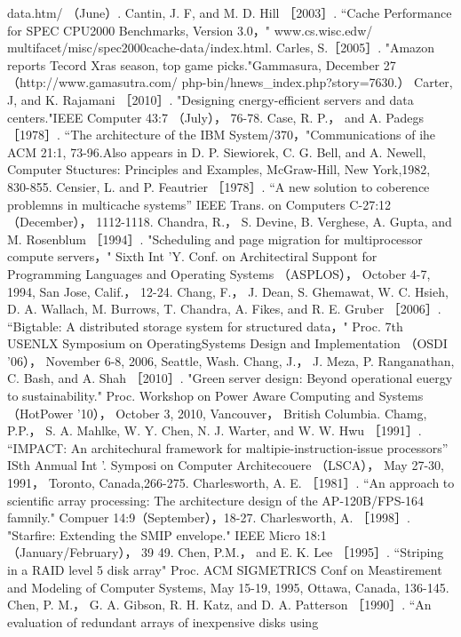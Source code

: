 data.htm/ （June）.
Cantin, J. F, and M. D. Hill ［2003］. “Cache Performance for SPEC CPU2000 Benchmarks, Version 3.0，" www.cs.wisc.edw/
multifacet/misc/spec2000cache-data/index.html.
Carles, S.［2005］. "Amazon reports Tecord Xras season, top game picks."Gammasura, December 27（http://www.gamasutra.com/
php-bin/hnews_index.php?story=7630.）
Carter, J, and K. Rajamani ［2010］. "Designing cnergy-efficient servers and data centers."IEEE Computer 43:7 （July）， 76-78.
Case, R. P.， and A. Padegs ［1978］. “The architecture of the IBM System/370，"Communications of ihe ACM 21:1, 73-96.Also
appears in D. P. Siewiorek, C. G. Bell, and A. Newell, Computer Stuctures: Principles and Examples, McGraw-Hill, New
York,1982, 830-855.
Censier, L. and P. Feautrier ［1978］. “A new solution to coberence problemns in multicache systems” IEEE Trans. on Computers
C-27:12 （December）， 1112-1118.
Chandra, R.， S. Devine, B. Verghese, A. Gupta, and M. Rosenblum ［1994］. "Scheduling and page migration for multiprocessor
compute servers，" Sixth Int 'Y. Conf. on Architectiral Suppont for Programming Languages and Operating Systems （ASPLOS），
October 4-7, 1994, San Jose, Calif.， 12-24.
Chang, F.， J. Dean, S. Ghemawat, W. C. Hsieh, D. A. Wallach, M. Burrows, T. Chandra, A. Fikes, and R. E. Gruber ［2006］.
“Bigtable: A distributed storage system for structured data，" Proc. 7th USENLX Symposium on OperatingSystems Design and
Implementation （OSDI '06）， November 6-8, 2006, Seattle, Wash.
Chang, J.， J. Meza, P. Ranganathan, C. Bash, and A. Shah ［2010］. "Green server design: Beyond operational euergy to
sustainability." Proc. Workshop on Power Aware Computing and Systems （HotPower '10）， October 3, 2010, Vancouver，
British Columbia.
Chamg, P.P.， S. A. Mahlke, W. Y. Chen, N. J. Warter, and W. W. Hwu ［1991］. “IMPACT: An architechural framework for
maltipie-instruction-issue processors” ISth Anmual Int '. Symposi on Computer Architecouere （LSCA）， May 27-30, 1991，
Toronto, Canada,266-275.
Charlesworth, A. E. ［1981］. “An approach to scientific array processing: The architecture design of the AP-120B/FPS-164
famnily." Compuer 14:9（September），18-27.
Charlesworth, A. ［1998］. "Starfire: Extending the SMIP envelope." IEEE Micro 18:1 （January/February）， 39 49.
Chen, P.M.， and E. K. Lee ［1995］. “Striping in a RAID level 5 disk array" Proc. ACM SIGMETRICS Conf on Meastirement and
Modeling of Computer Systems, May 15-19, 1995, Ottawa, Canada, 136-145.
Chen, P. M.， G. A. Gibson, R. H. Katz, and D. A. Patterson ［1990］. “An evaluation of redundant arrays of inexpensive disks using
